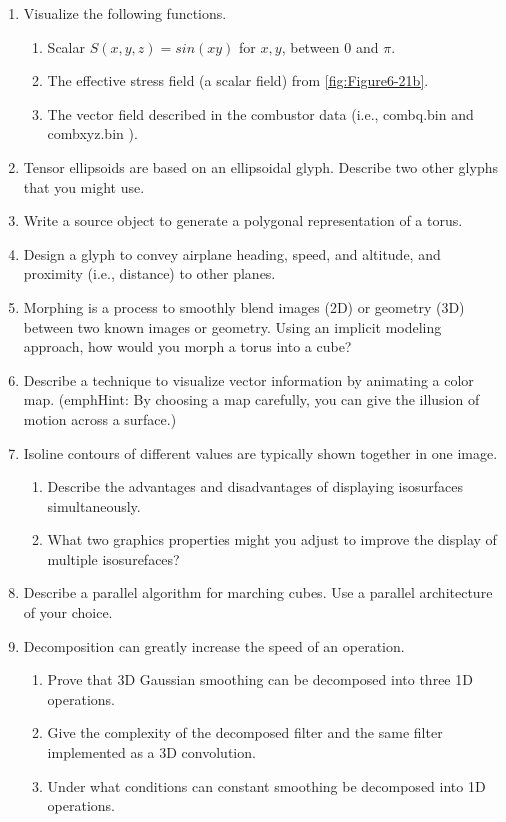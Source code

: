 \begin{enumerate}
\item Visualize the following functions.
\begin{enumerate}
	\item Scalar $S(x,y,z)=sin(xy)$ for $x,y$, between $0$ and $\pi$.
	\item The effective stress field (a scalar field) from \ref{fig:Figure6-21b}.
	\item The vector field described in the combustor data (i.e., combq.bin and combxyz.bin ).
\end{enumerate}

\item Tensor ellipsoids are based on an ellipsoidal glyph. Describe two other glyphs that you might use.

\item Write a source object to generate a polygonal representation of a torus.

\item Design a glyph to convey airplane heading, speed, and altitude, and proximity (i.e., distance) to other planes.

\item Morphing is a process to smoothly blend images (2D) or geometry (3D) between two known images or geometry. Using an implicit modeling approach, how would you morph a torus into a cube?

\item Describe a technique to visualize vector information by animating a color map. (emph{Hint:} By choosing a map carefully, you can give the illusion of motion across a surface.)

\item Isoline contours of different values are typically shown together in one image.
\begin{enumerate}
	\item Describe the advantages and disadvantages of displaying isosurfaces simultaneously.
	\item What two graphics properties might you adjust to improve the display of multiple isosurefaces?
\end{enumerate}

\item Describe a parallel algorithm for marching cubes. Use a parallel architecture of your choice.

\item Decomposition can greatly increase the speed of an operation.
\begin{enumerate}
	\item  Prove that 3D Gaussian smoothing can be decomposed into three 1D operations.
	\item Give the complexity of the decomposed filter and the same filter implemented as a 3D convolution.
	\item Under what conditions can constant smoothing be decomposed into 1D operations.
\end{enumerate}

\end{enumerate}
